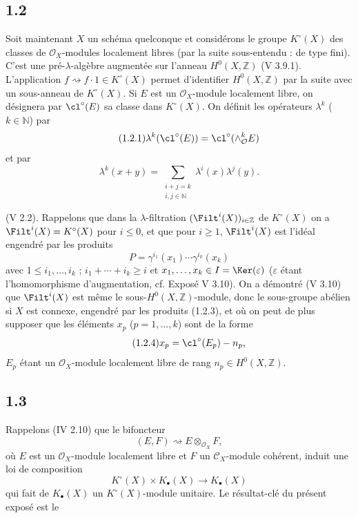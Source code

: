 \subsection*{1.2}
Soit maintenant $X$ un schéma quelconque et considérons le groupe $K^\circ(X)$ des classes de $\mathcal O_X$-modules localement libres (par la suite sous-entendu : de type fini). C'est une pré-$\lambda$-algèbre augmentée sur l'anneau $H^0(X,\mathbb Z)$ (V 3.9.1). L'application $f\rightsquigarrow f\cdot1\in K^\circ(X)$ permet d'identifier $H^0(X,\mathbb Z)$ par la suite avec un sous-anneau de $K^\circ(X)$. Si $E$ est un $\mathcal O_X$-module localement libre, on désignera par $\cl^\circ(E)$ sa classe dans $K^\circ(X)$. On définit les opérateurs $\lambda^k$ ($k\in\mathbb N$) par
\begin{equation}\tag{1.2.1}
\lambda^k(\cl^\circ(E))=\cl^\circ(\wedge_{\mathcal O}^kE)
\end{equation}
et par
\begin{equation}\tag{1.2.2}
\lambda^k(x+y)=\sum_{\substack{i+j=k\\ i,j\in\mathbb N}}\lambda^i(x)\lambda^j(y).
\end{equation}

(V 2.2). Rappelons que dans la $\lambda$-filtration $(\Filt^i(X))_{i\in\mathbb Z}$ de $K^\circ(X)$ on a $\Filt^i(X)=K^\circ(X)$ pour $i\leq0$, et que pour $i\geq1$, $\Filt^i(X)$ est l'idéal engendré par les produits
\begin{equation}\tag{1.2.3}
P=\gamma^{i_1}(x_1)\cdots\gamma^{i_k}(x_k)
\end{equation}
avec $1\leq i_1,\ldots,i_k$ ; $i_1+\cdots+i_k\geq i$ et $x_1,\ldots,x_k\in I=\Ker(\varepsilon)$ ($\varepsilon$ étant l'homomorphisme d'augmentation, cf. Exposé V 3.10). On a démontré (V 3.10) que $\Filt^i(X)$ est même le sous-$H^0(X,\mathbb Z)$-module, donc le sous-groupe abélien si $X$ est connexe, engendré par les produits (1.2.3), et où on peut de plus supposer que les éléments $x_p$ ($p=1,\ldots,k$) sont de la forme
\begin{equation}\tag{1.2.4}
x_p=\cl^\circ(E_p)-n_p,
\end{equation}
$E_p$ étant un $\mathcal O_X$-module localement libre de rang $n_p\in H^0(X,\mathbb Z)$.

\subsection*{1.3}
Rappelons (IV 2.10) que le bifoncteur
\[
(E,F)\rightsquigarrow E\otimes_{\mathcal O_X}F,
\]
où $E$ est un $\mathcal O_X$-module localement libre et $F$ un $\mathcal C_X$-module cohérent, induit une loi de composition
\begin{equation}\tag{1.3.1}
K^\circ(X)\times K_\bullet(X)\longrightarrow K_\bullet(X)
\end{equation}
qui fait de $K_\bullet(X)$ un $K^\circ(X)$-module unitaire. Le résultat-clé du présent exposé est le

